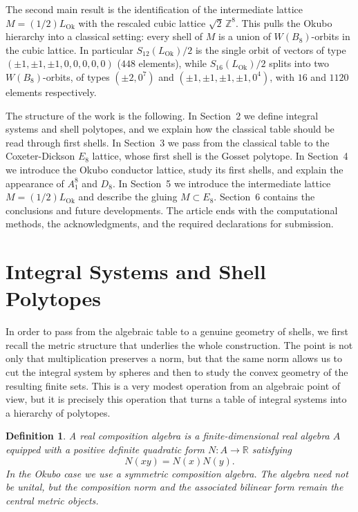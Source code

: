 \documentclass{birkjour}
\newtheorem{definition}[theorem]{Definition}
\newcommand{\LOk}{L_{\mathrm{Ok}}}
\newcommand{\ZZ}{\mathbb Z}
\newcommand{\RR}{\mathbb R}
\numberwithin{equation}{section}
\begin{document}
The second main result is the identification of the intermediate lattice
\(M=(1/2)\LOk\) with the rescaled cubic lattice \(\sqrt2\,\ZZ^8\). This pulls
the Okubo hierarchy into a classical setting: every shell of \(M\) is a union
of \(W(B_8)\)-orbits in the cubic lattice. In particular \(S_{12}(\LOk)/2\) is
the single orbit of vectors of type \((\pm1,\pm1,\pm1,0,0,0,0,0)\) (\(448\)
elements), while \(S_{16}(\LOk)/2\) splits into two \(W(B_8)\)-orbits, of types
\((\pm2,0^7)\) and \((\pm1,\pm1,\pm1,\pm1,0^4)\), with \(16\) and \(1120\)
elements respectively.  

The structure of the work is the following. In Section~2 we define integral
systems and shell polytopes, and we explain how the classical table should be
read through first shells. In Section~3 we pass from the classical table to the
Coxeter-Dickson \(E_8\) lattice, whose first shell is the Gosset polytope. In
Section~4 we introduce the Okubo conductor lattice, study its first shells, and
explain the appearance of \(A_1^8\) and \(D_8\). In Section~5 we introduce the
intermediate lattice \(M=(1/2)\LOk\) and describe the gluing
\(M\subset E_8\). Section~6 contains the conclusions and future developments.
The article ends with the computational methods, the acknowledgments, and the
required declarations for submission.

\section{Integral Systems and Shell Polytopes}

In order to pass from the algebraic table to a genuine geometry of shells, we
first recall the metric structure that underlies the whole construction. The
point is not only that multiplication preserves a norm, but that the same norm
allows us to cut the integral system by spheres and then to study the convex
geometry of the resulting finite sets. This is a very modest operation from an
algebraic point of view, but it is precisely this operation that turns a table
of integral systems into a hierarchy of polytopes.

\begin{definition}
A real composition algebra is a finite-dimensional real algebra \(A\) equipped
with a positive definite quadratic form \(N:A\to\RR\) satisfying
\begin{equation}
N(xy)=N(x)N(y).
\end{equation}
In the Okubo case we use a symmetric composition algebra. The algebra need not
be unital, but the composition norm and the associated bilinear form remain the
central metric objects.
\end{definition}
\end{document}
